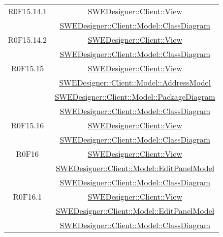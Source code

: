 \documentclass[../SpecificaTecnica.tex]{subfiles}
\begin{document}
\begin{longtable}{|c|c|}
		R0F15.14.1 & \hyperlink{SWEDesigner::Client::View}{SWEDesigner::Client::View}\\& \hyperlink{SWEDesigner::Client::Model::ClassDiagram}{SWEDesigner::Client::Model::ClassDiagram}\\\hline
		R0F15.14.2 & \hyperlink{SWEDesigner::Client::View}{SWEDesigner::Client::View}\\& \hyperlink{SWEDesigner::Client::Model::ClassDiagram}{SWEDesigner::Client::Model::ClassDiagram}\\\hline
		R0F15.15 & \hyperlink{SWEDesigner::Client::View}{SWEDesigner::Client::View}\\& \hyperlink{SWEDesigner::Client::Model::AddressModel}{SWEDesigner::Client::Model::AddressModel}\\& \hyperlink{SWEDesigner::Client::Model::PackageDiagram}{SWEDesigner::Client::Model::PackageDiagram} \\& \hyperlink{SWEDesigner::Client::Model::ClassDiagram}{SWEDesigner::Client::Model::ClassDiagram}\\\hline
		R0F15.16 & \hyperlink{SWEDesigner::Client::View}{SWEDesigner::Client::View} \\& \hyperlink{SWEDesigner::Client::Model::ClassDiagram}{SWEDesigner::Client::Model::ClassDiagram}\\\hline
		R0F16 & \hyperlink{SWEDesigner::Client::View}{SWEDesigner::Client::View} \\& \hyperlink{SWEDesigner::Client::Model::EditPanelModel}{SWEDesigner::Client::Model::EditPanelModel} \\& \hyperlink{SWEDesigner::Client::Model::ClassDiagram}{SWEDesigner::Client::Model::ClassDiagram}\\\hline
		R0F16.1 & \hyperlink{SWEDesigner::Client::View}{SWEDesigner::Client::View} \\& \hyperlink{SWEDesigner::Client::Model::EditPanelModel}{SWEDesigner::Client::Model::EditPanelModel} \\& \hyperlink{SWEDesigner::Client::Model::ClassDiagram}{SWEDesigner::Client::Model::ClassDiagram}\\\hline
	

\end{longtable}
\end{document}
